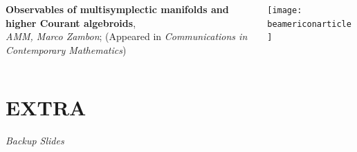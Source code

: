 \documentclass[handout,10pt]{beamer}
\begin{document}
\begin{frame}{}
\begin{columns}
			\begin{column}{0.8\linewidth}
				\centering
				\textbf{Observables of multisymplectic manifolds and higher Courant algebroids},
				\\
				\emph{AMM, Marco Zambon};%
				(Appeared in \emph{Communications in Contemporary Mathematics})	
			\end{column}
			\begin{column}{0.05\linewidth}
				\centering \texttt{[image: beamericonarticle]}			
			\end{column}
			\hfill
		\end{columns}
	\end{frame}


\appendix
\section{EXTRA}
\begin{frame}
	\begin{center}
	\Huge\emph{Backup Slides}
	\end{center}
\end{frame}
\addtocounter{framenumber}{-1}
\end{document}
